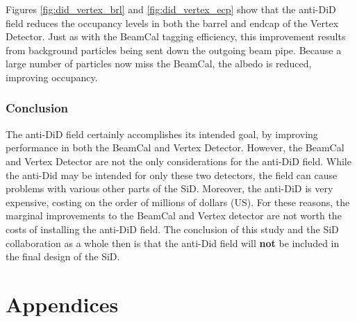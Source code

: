 \documentclass{report}
\begin{document}
                Figures \ref{fig:did_vertex_brl} and \ref{fig:did_vertex_ecp} show that the anti-DiD field reduces the occupancy levels in both the barrel and endcap of the Vertex Detector. Just as with the BeamCal tagging efficiency, this improvement results from background particles being sent down the outgoing beam pipe. Because a large number of particles now miss the BeamCal, the albedo is reduced, improving occupancy.

            \subsection{Conclusion}
                The anti-DiD field certainly accomplishes its intended goal, by improving performance in both the BeamCal and Vertex Detector. However, the BeamCal and Vertex Detector are not the only considerations for the anti-DiD field. While the anti-Did may be intended for only these two detectors, the field can cause problems with various other parts of the SiD. Moreover, the anti-DiD is very expensive, costing on the order of millions of dollars (US). For these reasons, the marginal improvements to the BeamCal and Vertex detector are not worth the costs of installing the anti-DiD field. The conclusion of this study and the SiD collaboration as a whole then is that the anti-Did field will \textbf{not} be included in the final design of the SiD.





    \chapter{Appendices}
\end{document}
